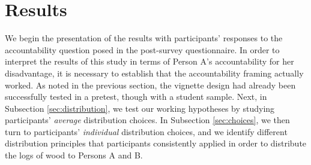 \documentclass[smallcondensed]{svjour3}
\begin{document}
\section{Results}\label{sec:results}
%
We begin the presentation of the results with participants' responses to the accountability question posed in the post-survey questionnaire. In order to interpret the results of this study in terms of Person A's accountability for her disadvantage, it is necessary to establish that the accountability framing actually worked. As noted in the previous section, the vignette design had already been successfully tested in a pretest, though with a student sample. Next, in Subsection \ref{sec:distribution}, we test our working hypotheses by studying participants' \textit{average} distribution choices. In Subsection \ref{sec:choices}, we then turn to participants' \textit{individual} distribution choices, and we identify different distribution principles that participants consistently applied in order to distribute the logs of wood to Persons A and B.\par
%
\end{document}
